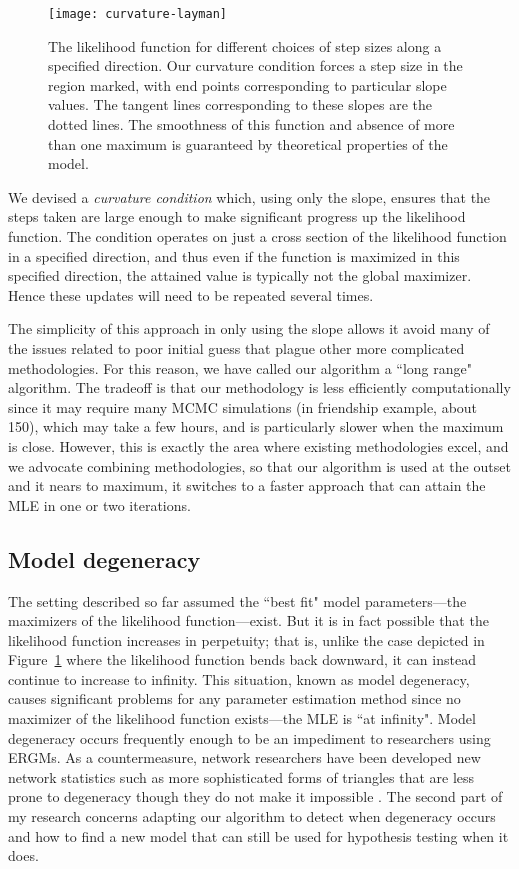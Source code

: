 \documentclass[12pt]{article}
\begin{document}
\begin{figure}[!h]
\centering
\texttt{[image: curvature-layman]}
\caption{The likelihood function for different choices of step sizes along 
a specified direction.  Our curvature condition forces a step size in the 
region marked, with end points corresponding to particular slope values.  
The tangent lines corresponding to these slopes are the dotted lines.
The smoothness of this function and absence of more than one maximum is guaranteed 
by theoretical properties of the model.}
\label{F:curvature}
\end{figure}

We devised a \emph{curvature condition} which, using only the slope, ensures 
that the steps taken are large enough to make significant progress up the 
likelihood function.  The condition operates on just 
a cross section of the likelihood function in a specified direction, and 
thus even if the function is maximized in this specified direction, the attained 
value is typically not the global maximizer.  Hence these updates will need to be 
repeated several times.

The simplicity of this approach in only using the slope allows it avoid 
many of the issues related to poor initial guess that plague other 
more complicated methodologies.  For this reason, we have called our 
algorithm a ``long range" algorithm.
The tradeoff is that our methodology is less efficiently computationally
since it may require many MCMC simulations (in friendship example, about 150), 
which may take a few hours, and is particularly slower when the maximum 
is close.  However, this is exactly the area
where existing methodologies excel, and we advocate combining methodologies, 
so that our algorithm is used at the outset and it nears to maximum, it 
switches to a faster approach that can attain the MLE in one or two iterations.

\subsection{Model degeneracy}
The setting described so far assumed the ``best fit" model parameters---the 
maximizers of the likelihood function---exist.
But it is in fact possible that the likelihood function increases in perpetuity;
that is, unlike the case depicted in Figure~\ref{F:curvature} where 
the likelihood function bends back downward, it can instead continue 
to increase to infinity.  This situation, known as model degeneracy, 
causes significant problems for any parameter estimation method since 
no maximizer of the likelihood function exists---the MLE
is ``at infinity".  Model degeneracy occurs frequently enough to be an impediment to 
researchers using ERGMs.  As a countermeasure, network researchers have been developed
 new network statistics such as more sophisticated forms of triangles that are 
less prone to degeneracy though they do not make it impossible 
\citep{Handcock:degeneracy,advancesp*,recentp*,statnet-tutorial}.
The second part of my research concerns adapting our algorithm to detect 
when degeneracy occurs and how to find a new model that can still 
be used for hypothesis testing when it does.
\end{document}
